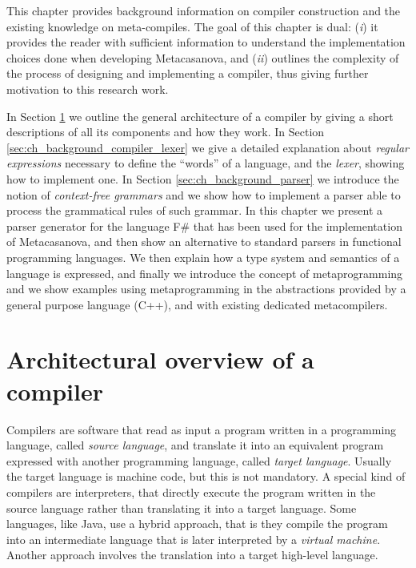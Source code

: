 This chapter provides background information on compiler construction and the existing knowledge on meta-compiles. The goal of this chapter is dual: (\textit{i}) it provides the reader with sufficient information to understand the implementation choices done when developing Metacasanova, and (\textit{ii}) outlines the complexity of the process of designing and implementing a compiler, thus giving further motivation to this research work.

In Section \ref{sec:ch_background_compiler_architecture} we outline the general architecture of a compiler by giving a short descriptions of all its components and how they work. In Section \ref{sec:ch_background_compiler_lexer} we give a detailed explanation about \textit{regular expressions} necessary to define the ``words'' of a language, and the \textit{lexer}, showing how to implement one. In Section \ref{sec:ch_background_parser} we introduce the notion of \textit{context-free grammars} and we show how to implement a parser able to process the grammatical rules of such grammar. In this chapter we present a parser generator for the language F\# that has been used for the implementation of Metacasanova, and then show an alternative to standard parsers in functional programming languages. We then explain how a type system and semantics of a language is expressed, and finally we introduce the concept of metaprogramming and we show examples using metaprogramming in the abstractions provided by a general purpose language (C++), and with existing dedicated metacompilers.

\section{Architectural overview of a compiler}
\label{sec:ch_background_compiler_architecture}
Compilers are software that read as input a program written in a programming language, called \textit{source language}, and translate it into an equivalent program expressed with another programming language, called \textit{target language}. Usually the target language is machine code, but this is not mandatory. A special kind of compilers are interpreters, that directly execute the program written in the source language rather than translating it into a target language. Some languages, like Java, use a hybrid approach, that is they compile the program into an intermediate language that is later interpreted by a \textit{virtual machine}. Another approach involves the translation into a target high-level language.

